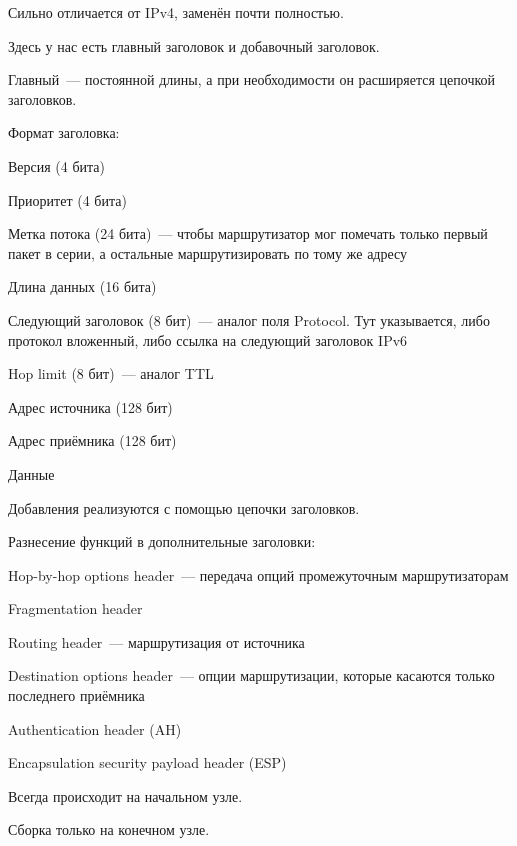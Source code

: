 
Сильно отличается от IPv4, заменён почти полностью.


Здесь у нас есть главный заголовок и добавочный заголовок.

Главный~--- постоянной длины, а при необходимости он расширяется цепочкой заголовков.

Формат заголовка:
\begin{MyItemize}
    \item Версия (4 бита)
    \item Приоритет (4 бита)
    \item Метка потока (24 бита)~--- чтобы маршрутизатор мог помечать только первый пакет в серии, а остальные маршрутизировать по тому же адресу
    \item Длина данных (16 бита)
    \item Следующий заголовок (8 бит)~--- аналог поля Protocol. Тут указывается, либо протокол вложенный, либо ссылка на следующий заголовок IPv6
    \item Hop limit (8 бит)~--- аналог TTL
    \item Адрес источника (128 бит)
    \item Адрес приёмника (128 бит)
    \item Данные
\end{MyItemize}

Добавления реализуются с помощью цепочки заголовков.

Разнесение функций в дополнительные заголовки:
\begin{MyItemize}
    \item Hop-by-hop options header~--- передача опций промежуточным маршрутизаторам
    \item Fragmentation header
    \item Routing header~--- маршрутизация от источника
    \item Destination options header~--- опции маршрутизации, которые касаются только последнего приёмника
    \item Authentication header (AH)
    \item Encapsulation security payload header (ESP)
\end{MyItemize}


Всегда происходит на начальном узле.

Сборка только на конечном узле.

